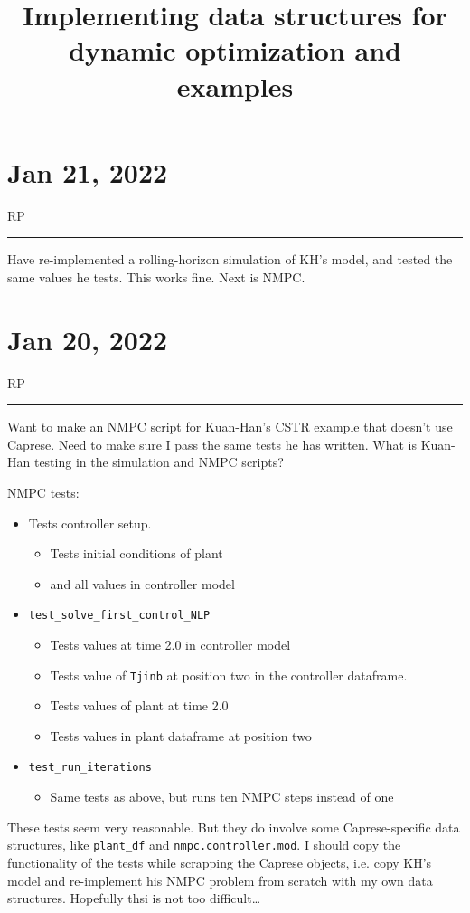 \documentclass{article}
\title{Implementing data structures for dynamic optimization and examples}
\newcommand{\RP}{\vspace{0.5cm}RP\hrule\vspace{0.5cm}}
\begin{document}
\maketitle

\section{Jan 21, 2022}

\RP
Have re-implemented a rolling-horizon simulation of KH's model,
and tested the same values he tests. This works fine. Next is NMPC.

\section{Jan 20, 2022}

\RP
Want to make an NMPC script for Kuan-Han's CSTR example that doesn't use
Caprese. Need to make sure I pass the same tests he has written.
What is Kuan-Han testing in the simulation and NMPC scripts?

NMPC tests:
\begin{itemize}
  \item Tests controller setup.
    \begin{itemize}
      \item  Tests initial conditions of plant
      \item  and all values in controller model
    \end{itemize}
  \item \texttt{test\_solve\_first\_control\_NLP}
    \begin{itemize}
      \item Tests values at time 2.0 in controller model
      \item Tests value of \texttt{Tjinb} at position two in the controller
        dataframe.
      \item Tests values of plant at time 2.0
      \item Tests values in plant dataframe at position two
    \end{itemize}
  \item \texttt{test\_run\_iterations}
    \begin{itemize}
      \item Same tests as above, but runs ten NMPC steps instead of one
    \end{itemize}
\end{itemize}
These tests seem very reasonable. But they do involve some Caprese-specific data
structures, like \texttt{plant\_df} and \texttt{nmpc.controller.mod}.
I should copy the functionality of the tests while scrapping the Caprese
objects, i.e. copy KH's model and re-implement his NMPC problem from scratch
with my own data structures.
Hopefully thsi is not too difficult\ldots
\end{document}
